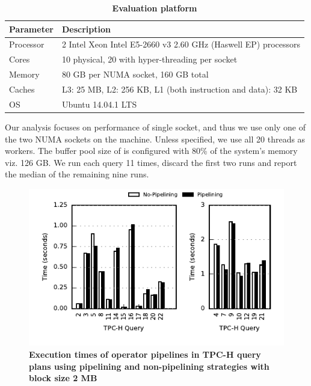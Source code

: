 \begin{table}[h]
	\centering
	\begin{tabular}{|p{0.62in}|p{2.4in}|}
		\hline
		\textbf{Parameter} & \textbf{Description} \\ \hline
		Processor & 2 Intel Xeon Intel E5-2660 v3 2.60 GHz (Haswell EP) processors\\ \hline
		Cores & 10 physical, 20 with hyper-threading per socket \\ \hline
		Memory & 80 GB per NUMA socket, 160 GB total \\ \hline
		Caches & L3: 25 MB, L2: 256 KB, L1 (both instruction and data): 32 KB \\ \hline
		OS & Ubuntu 14.04.1 LTS \\ \hline
	\end{tabular}
	\caption{\textbf{Evaluation platform}}
	\label{table:hardware}
\end{table}

Our analysis focuses on performance of single socket, and thus we use only one of the two NUMA sockets on the machine.
Unless specified, we use all 20 threads as \sys{} workers.
The buffer pool size of \sys{} is configured with 80\% of the system's memory viz. 126 GB.
We run each query 11 times, discard the first two runs and report the median of the remaining nine runs. 



\begin{figure}[ht]
	\centering 
	\includegraphics{pipeline/figures/deep-pipeline-comparison-2mb-withlip}
	\caption{\textbf{Execution times of operator pipelines in TPC-H query plans using pipelining and non-pipelining strategies with block size 2 MB}}
	\label{fig:deep-pipeline-comparison-2mb}
\end{figure}

